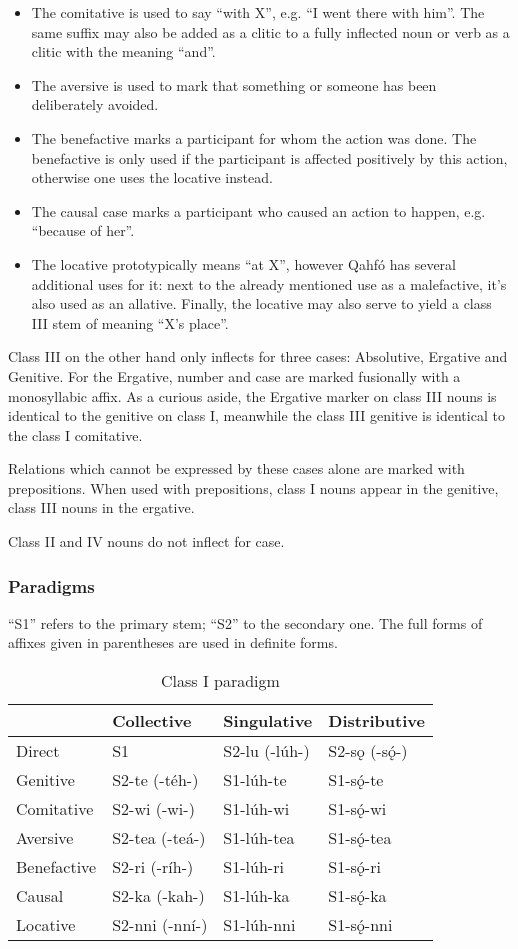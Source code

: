 \documentclass{article}
\newcommand{\con}[1]{\hspace{0pt}{\color{olive}#1}}
\newcommand{\langname}{Qahfó}
\begin{document}
\begin{itemize}
\item The comitative is used to say “with X”, e.g. “I went there with him”. The same suffix \con{-wi} may also be added as a clitic to a fully inflected noun or verb as a clitic with the meaning “and”.
\item The aversive is used to mark that something or someone has been deliberately avoided.
\item The benefactive marks a participant for whom the action was done. The benefactive is only used if the participant is affected positively by this action, otherwise one uses the locative instead.
\item The causal case marks a participant who caused an action to happen, e.g. “because of her”.
\item The locative prototypically means “at X”, however \langname{} has several additional uses for it: next to the already mentioned use as a malefactive, it’s also used as an allative. Finally, the locative may also serve to yield a class III stem of meaning “X’s place”.
\end{itemize}

Class III on the other hand only inflects for three cases: Absolutive, Ergative and Genitive. For the Ergative, number and case are marked fusionally with a monosyllabic affix. As a curious aside, the Ergative marker on class III nouns is identical to the genitive on class I, meanwhile the class III genitive is identical to the class I comitative.

Relations which cannot be expressed by these cases alone are marked with prepositions. When used with prepositions, class I nouns appear in the genitive, class III nouns in the ergative.

Class II and IV nouns do not inflect for case.  

\subsubsection{Paradigms}
“S1” refers to the primary stem; “S2” to the secondary one. The full forms of affixes given in parentheses are used in definite forms.

\begin{table}[H]
\centering
\caption{Class I paradigm}
\label{cl1}
\begin{tabular}{l|lll}
            & Collective     & Singulative & Distributive     \\ \hline
Direct      & S1             & S2-lu (-lúh-)      & S2-sǫ (-sǫ́-)     \\
Genitive    & S2-te (-téh-)  & S1-lúh-te   & S1-sǫ́-te  \\
Comitative  & S2-wi (-wi-)   & S1-lúh-wi   & S1-sǫ́-wi  \\
Aversive    & S2-tea (-teá-) & S1-lúh-tea  & S1-sǫ́-tea \\
Benefactive & S2-ri (-ríh-)  & S1-lúh-ri   & S1-sǫ́-ri  \\
Causal      & S2-ka (-kah-)  & S1-lúh-ka   & S1-sǫ́-ka  \\
Locative    & S2-nni (-nní-) & S1-lúh-nni  & S1-sǫ́-nni
\end{tabular}
\end{table}
\end{document}
